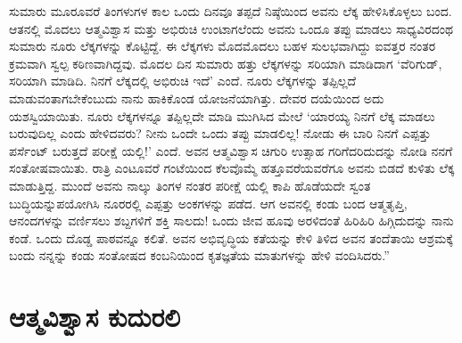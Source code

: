 ಸುಮಾರು ಮೂರೂವರೆ ತಿಂಗಳುಗಳ ಕಾಲ ಒಂದು ದಿನವೂ ತಪ್ಪದೆ ನಿಷ್ಠೆಯಿಂದ ಅವನು ಲೆಕ್ಕ ಹೇಳಿಸಿಕೊಳ್ಳಲು ಬಂದ. ಆತನಲ್ಲಿ ಮೊದಲು ಆತ್ಮವಿಶ್ವಾಸ ಮತ್ತು ಅಭಿರುಚಿ ಉಂಟಾಗಲೆಂದು ಅವನು ಒಂದೂ ತಪ್ಪು ಮಾಡಲು ಸಾಧ್ಯವಿರದಂಥ ಸುಮಾರು ನೂರು ಲೆಕ್ಕಗಳನ್ನು ಕೊಟ್ಟಿದ್ದೆ. ಈ ಲೆಕ್ಕಗಳು ಮೊದಮೊದಲು ಬಹಳ ಸುಲಭವಾಗಿದ್ದು ಐವತ್ತರ ನಂತರ ಕ್ರಮವಾಗಿ ಸ್ವಲ್ಪ ಕಠಿಣವಾಗಿದ್ದವು. ಮೊದಲ ದಿನ ಸುಮಾರು ಹತ್ತು ಲೆಕ್ಕಗಳನ್ನು ಸರಿಯಾಗಿ ಮಾಡಿದಾಗ ‘ವೆರಿಗುಡ್, ಸರಿಯಾಗಿ ಮಾಡಿದಿ. ನಿನಗೆ ಲೆಕ್ಕದಲ್ಲಿ ಅಭಿರುಚಿ ಇದೆ’ ಎಂದೆ. ನೂರು ಲೆಕ್ಕಗಳನ್ನು ತಪ್ಪಿಲ್ಲದೆ ಮಾಡುವಂತಾಗಬೇಕೆಂಬುದು ನಾನು ಹಾಕಿಕೊಂಡ ಯೋಜನೆಯಾಗಿತ್ತು. ದೇವರ ದಯೆಯಿಂದ ಅದು ಯಶಸ್ವಿಯಾಯಿತು. ನೂರು ಲೆಕ್ಕಗಳನ್ನೂ ತಪ್ಪಿಲ್ಲದೇ ಮಾಡಿ ಮುಗಿಸಿದ ಮೇಲೆ ‘ಯಾರಯ್ಯ ನಿನಗೆ ಲೆಕ್ಕ ಮಾಡಲು ಬರುವುದಿಲ್ಲ ಎಂದು ಹೇಳಿದವರು? ನೀನು ಒಂದೇ ಒಂದು ತಪ್ಪು ಮಾಡಲಿಲ್ಲ! ನೋಡು ಈ ಬಾರಿ ನಿನಗೆ ಎಪ್ಪತ್ತು ಪರ್ಸೆಂಟ್ ಬರುತ್ತದೆ ಪರೀಕ್ಷೆ ಯಲ್ಲಿ!’ ಎಂದೆ. ಅವನ ಆತ್ಮವಿಶ್ವಾಸ ಚಿಗುರಿ ಉತ್ಸಾಹ ಗರಿಗೆದರಿದುದನ್ನು ನೋಡಿ ನನಗೆ ಸಂತೋಷವಾಯಿತು. ರಾತ್ರಿ ಎಂಟೂವರೆ ಗಂಟೆಯಿಂದ ಕೆಲವೊಮ್ಮೆ ಹತ್ತೂವರೆಯವರೆಗೂ ಅವನು ಬಿಡದೆ ಕುಳಿತು ಲೆಕ್ಕ ಮಾಡುತ್ತಿದ್ದ. ಮುಂದೆ ಅವನು ನಾಲ್ಕು ತಿಂಗಳ ನಂತರ ಪರೀಕ್ಷೆ ಯಲ್ಲಿ ಕಾಪಿ ಹೊಡೆಯದೇ ಸ್ವಂತ ಬುದ್ಧಿಯನ್ನುಪಯೋಗಿಸಿ ನೂರರಲ್ಲಿ ಎಪ್ಪತ್ತು ಅಂಕಗಳನ್ನು ಪಡೆದ. ಆಗ ಅವನಲ್ಲಿ ಕಂಡು ಬಂದ ಆತ್ಮತೃಪ್ತಿ, ಆನಂದಗಳನ್ನು ವರ್ಣಿಸಲು ಶಬ್ದಗಳಿಗೆ ಶಕ್ತಿ ಸಾಲದು! ಒಂದು ಜೀವ ಹೂವು ಅರಳಿದಂತೆ ಹಿರಿಹಿರಿ ಹಿಗ್ಗಿದುದನ್ನು ನಾನು ಕಂಡೆ. ಒಂದು ದೊಡ್ಡ ಪಾಠವನ್ನೂ ಕಲಿತೆ. ಅವನ ಅಭಿವೃದ್ಧಿಯ ಕತೆಯನ್ನು ಕೇಳಿ ತಿಳಿದ ಅವನ ತಂದೆತಾಯಿ ಆಶ್ರಮಕ್ಕೆ ಬಂದು ನನ್ನನ್ನು ಕಂಡು ಸಂತೋಷದ ಕಂಬನಿಯಿಂದ ಕೃತಜ್ಞತೆಯ ಮಾತುಗಳನ್ನು ಹೇಳಿ ವಂದಿಸಿದರು.”


\section*{ಆತ್ಮವಿಶ್ವಾಸ ಕುದುರಲಿ}



